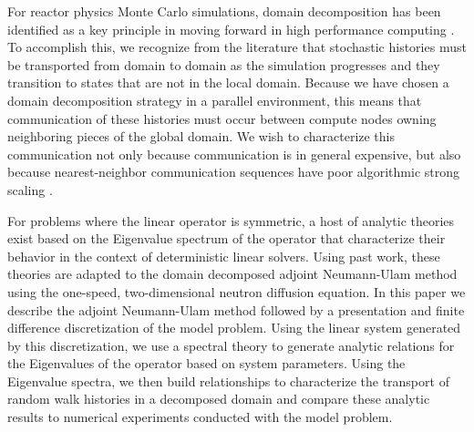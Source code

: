 \documentclass[letterpaper,12pt]{article}
\begin{document}
For reactor physics Monte Carlo simulations, domain decomposition has
been identified as a key principle in moving forward in high
performance computing
\cite{brunner_comparison_2006,siegel_analysis_2012}. To accomplish
this, we recognize from the literature that stochastic histories must
be transported from domain to domain as the simulation progresses and
they transition to states that are not in the local domain. Because we
have chosen a domain decomposition strategy in a parallel environment,
this means that communication of these histories must occur between
compute nodes owning neighboring pieces of the global domain. We wish
to characterize this communication not only because communication is
in general expensive, but also because nearest-neighbor communication
sequences have poor algorithmic strong scaling
\cite{gropp_high-performance_2001}.

For problems where the linear operator is symmetric, a host of
analytic theories exist based on the Eigenvalue spectrum of the
operator that characterize their behavior in the context of
deterministic linear solvers. Using past work, these theories are
adapted to the domain decomposed adjoint Neumann-Ulam method using the
one-speed, two-dimensional neutron diffusion equation. In this paper
we describe the adjoint Neumann-Ulam method followed by a presentation
and finite difference discretization of the model problem. Using the
linear system generated by this discretization, we use a spectral
theory to generate analytic relations for the Eigenvalues of the
operator based on system parameters. Using the Eigenvalue spectra, we
then build relationships to characterize the transport of random walk
histories in a decomposed domain and compare these analytic results to
numerical experiments conducted with the model problem.

\end{document}
